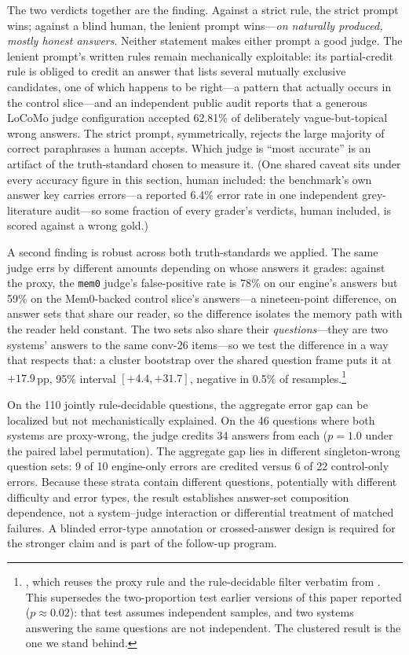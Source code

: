 \documentclass[11pt]{article}
\begin{document}
The two verdicts together are the finding. Against a strict rule, the strict prompt wins; against a blind human, the lenient prompt wins---\emph{on naturally produced, mostly honest answers}. Neither statement makes either prompt a good judge. The lenient prompt's written rules remain mechanically exploitable: its partial-credit rule is obliged to credit an answer that lists several mutually exclusive candidates, one of which happens to be right---a pattern that actually occurs in the control slice---and an independent public audit reports that a generous LoCoMo judge configuration accepted 62.81\% of deliberately vague-but-topical wrong answers\citep{locomoaudit}. The strict prompt, symmetrically, rejects the large majority of correct paraphrases a human accepts. Which judge is ``most accurate'' is an artifact of the truth-standard chosen to measure it. (One shared caveat sits under every accuracy figure in this section, human included: the benchmark's own answer key carries errors---a reported 6.4\% error rate in one independent grey-literature audit\citep{locomoaudit}---so some fraction of every grader's verdicts, human included, is scored against a wrong gold.)

A second finding is robust across both truth-standards we applied. The same judge errs by different amounts depending on whose answers it grades: against the proxy, the \texttt{mem0} judge's false-positive rate is 78\% on our engine's answers but 59\% on the Mem0-backed control slice's answers---a nineteen-point difference, on answer sets that share our reader, so the difference isolates the memory path with the reader held constant. The two sets also share their \emph{questions}---they are two systems' answers to the same conv-26 items---so we test the difference in a way that respects that: a cluster bootstrap over the shared question frame puts it at $+17.9$\,pp, 95\% interval $[+4.4, +31.7]$, negative in 0.5\% of resamples.\footnote{, which reuses the proxy rule and the rule-decidable filter verbatim from . This supersedes the two-proportion test earlier versions of this paper reported ($p \approx 0.02$): that test assumes independent samples, and two systems answering the same questions are not independent. The clustered result is the one we stand behind.}

On the 110 jointly rule-decidable questions, the aggregate error gap can be localized but not mechanistically explained. On the 46 questions where both systems are proxy-wrong, the judge credits 34 answers from each ($p=1.0$ under the paired label permutation). The aggregate gap lies in different singleton-wrong question sets: 9 of 10 engine-only errors are credited versus 6 of 22 control-only errors. Because these strata contain different questions, potentially with different difficulty and error types, the result establishes answer-set composition dependence, not a system--judge interaction or differential treatment of matched failures. A blinded error-type annotation or crossed-answer design is required for the stronger claim and is part of the follow-up program.
\end{document}

